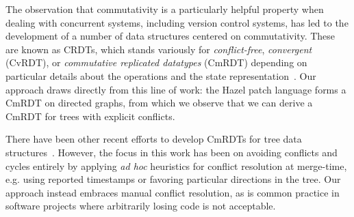 The observation that commutativity is a particularly helpful property when dealing with concurrent systems, including version control systems, has led to the development of a number of data structures centered on commutativity. These are known as CRDTs, which stands variously for \emph{conflict-free}, \emph{convergent} (CvRDT), or \emph{commutative replicated datatypes} (CmRDT) depending on particular details about the operations and the state representation~\cite{shapiro2011conflict}.
Our approach draws directly from this line of work: the Hazel patch language forms a CmRDT on directed graphs, from which we observe that we can derive a CmRDT for trees with explicit conflicts.

There have been other recent efforts to develop CmRDTs for tree data structures~\cite{DBLP:conf/icdcs/PreguicaMSL09, Highly-Available}. However, the focus in this work has been on avoiding conflicts and cycles entirely by applying \emph{ad hoc} heuristics for conflict resolution at merge-time, e.g. using reported timestamps or favoring particular directions in the tree. Our approach instead embraces manual conflict resolution, as is common practice in software projects where arbitrarily losing code is not acceptable.















